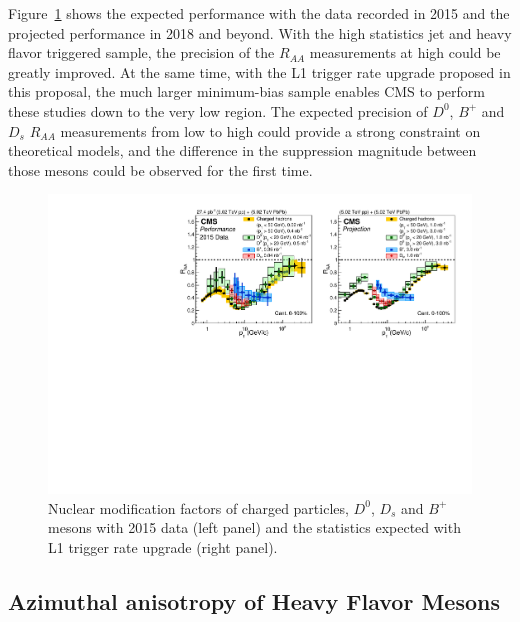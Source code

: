 Figure~\ref{fig:RAA_2015} shows the expected performance with the data recorded in 2015 and the projected performance in 2018 and beyond. With the high statistics jet and heavy flavor triggered sample, the precision of the $R_{AA}$ measurements at high \pt could be greatly improved. At the same time, with the L1 trigger rate upgrade proposed in this proposal, the much larger minimum-bias sample enables CMS to perform these studies down to the very low \pt region. The expected precision of $D^0$, $B^+$ and $D_s$ $R_{AA}$ measurements from low \pt to high \pt could provide a strong constraint on theoretical models, and the difference in the suppression magnitude between those mesons could be observed for the first time.


\begin{figure}[!ht]
\begin{center}
\includegraphics[width=.98\textwidth]{figures/cRAA_lumiTG_3_lumiMB_1_v2.pdf}
\caption{Nuclear modification factors of charged particles, $D^0$, $D_s$ and $B^+$ mesons with 2015 data (left panel) and the statistics expected with L1 trigger rate upgrade (right panel).}
\label{fig:RAA_2015}
\end{center}
\end{figure}

\subsection{Azimuthal anisotropy of Heavy Flavor Mesons}

